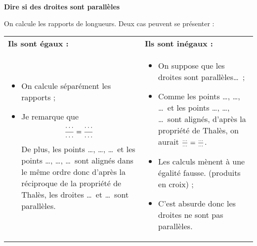
\textbf{Dire si des droites sont parallèles}\\
\begin{minipage}{\linewidth}
On calcule les rapports de longueurs. Deux cas peuvent se présenter :\\
\noindent
\begin{tabular}{p{6cm}|p{6cm}}
\hfil\bf Ils sont égaux : & \hfil\bf Ils sont inégaux : \\
\begin{itemize}
\item On calcule séparément les rapports ;
\item Je remarque que $${\cdots\over\cdots}={\cdots\over\cdots}$$
De plus, les points \dots, \dots, \dots\ et les points
\dots, \dots, \dots\ sont alignés dans le même ordre
donc d'après la réciproque de la propriété de Thalès, les droites \dots\ et
\dots\ sont parallèles.
\end{itemize}
&
\begin{itemize}
\item On suppose que les droites sont parallèles\dots\ ;
\item Comme les points \dots, \dots, \dots\ et les points
\dots, \dots, \dots\ sont alignés, d'après la propriété de Thalès,
on aurait ${\cdots\over\cdots}={\cdots\over\cdots}$.
\item Les calculs mènent à une égalité fausse. (produits en croix) ;
\item C'est absurde donc les droites ne sont pas parallèles.
\end{itemize}

\end{tabular}
\end{minipage}